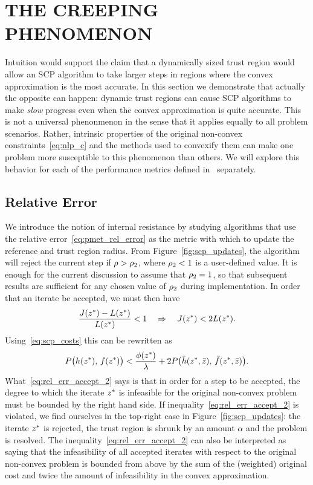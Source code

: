 \documentclass[letterpaper, 10 pt, conference]{ieeeconf}
\begin{document}
\section{THE CREEPING PHENOMENON}

Intuition would support the claim that a dynamically sized trust region would allow an SCP algorithm to take larger steps in regions where the convex approximation is the most accurate. In this section we demonstrate that actually the opposite can happen: dynamic trust regions can cause SCP algorithms to make \textit{slow} progress even when the convex approximation is quite accurate. This is not a universal phenonmenon in the sense that it applies equally to all problem scenarios. Rather, intrinsic properties of the original non-convex constraints~\eqref{eq:nlp_c} and the methods used to convexify them can make one problem more susceptible to this phenomenon than others. We will explore this behavior for each of the performance metrics defined in~ separately.

\subsection{Relative Error}\label{subsec:creep_rel_err}

We introduce the notion of internal resistance by studying algorithms that use the relative error~\eqref{eq:pmet_rel_error} as the metric with which to update the reference and trust region radius. From Figure~\ref{fig:scp_updates}, the algorithm will reject the current step if $\rho>\rho_2$, where $\rho_2<1$ is a user-defined value. It is enough for the current discussion to assume that $\rho_2=1$, so that subsequent results are sufficient for any chosen value of $\rho_2$ during implementation. In order that an iterate be accepted, we must then have
\begin{equation}
\frac{J(z^*) - L(z^*)}{L(z^*)} < 1 \quad \Rightarrow \quad  J(z^*) < 2 L(z^*).
\label{eq:rel_err_accept}
\end{equation} 
Using~\eqref{eq:scp_costs} this can be rewritten as
\begin{equation}
P\big( h(z^*),\,f(z^*) \big) < \frac{\phi(z^*)}{\lambda} + 2 P\big( \bar{h}(z^*,\bar{z}),\,\bar{f}(z^*,\bar{z}) \big).
\label{eq:rel_err_accept_2}
\end{equation}
What~\eqref{eq:rel_err_accept_2} says is that in order for a step to be accepted, the degree to which the iterate $z^*$ is infeasible for the original non-convex problem must be bounded by the right hand side. If inequality~\eqref{eq:rel_err_accept_2} is violated, we find ourselves in the top-right case in Figure~\ref{fig:scp_updates}: the iterate $z^*$ is rejected, the trust region is shrunk by an amount $\alpha$ and the problem is resolved. The inequality~\eqref{eq:rel_err_accept_2} can also be interpreted as saying that the infeasibility of all accepted iterates with respect to the original non-convex problem is bounded from above by the sum of the (weighted) original cost and twice the amount of infeasibility in the convex approximation. 
\end{document}
